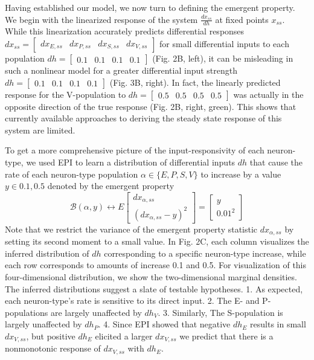 \documentclass[11pt]{article}
\begin{document}
Having established our model, we now turn to defining the emergent property. We begin with the linearized response of the system $\frac{dx_{ss}}{dh}$ at fixed points $x_{ss}$. 
While this linearization accurately predicts differential responses $dx_{ss} = \begin{bmatrix} dx_{E,ss} & dx_{P,ss} & dx_{S,ss} & dx_{V,ss} \end{bmatrix}$  for small differential inputs to each population $dh = \begin{bmatrix} 0.1 & 0.1 & 0.1 & 0.1 \end{bmatrix}$ (Fig. 2B, left), it can be misleading in such a nonlinear model for a greater differential input strength $dh = \begin{bmatrix} 0.1 & 0.1 & 0.1 & 0.1 \end{bmatrix}$ (Fig. 3B, right). In fact, the linearly predicted response for the V-population to $dh = \begin{bmatrix} 0.5 & 0.5 & 0.5 & 0.5 \end{bmatrix}$ was actually in the opposite direction of the true response (Fig. 2B, right, green).  This shows that currently available approaches  to deriving the steady state response of this system are limited.

To get a more comprehensive picture of the input-responsivity of each neuron-type, we used EPI to learn a distribution of differential inputs $dh$ that cause the rate of each neuron-type population $\alpha \in \{E, P, S, V \}$ to increase by a value $y \in {0.1, 0.5}$ denoted by the emergent property 
\begin{equation}
\mathcal{B}(\alpha, y) \leftrightarrow 
E \begin{bmatrix} dx_{\alpha,ss} \\ (dx_{\alpha,ss} - y)^2 \end{bmatrix} = \begin{bmatrix} y \\ 0.01^2 \end{bmatrix}
\end{equation}
Note that we restrict the variance of the emergent property statistic $dx_{\alpha,ss}$ by setting its second moment to a small value. In Fig. 2C, each column visualizes the inferred distribution of $dh$ corresponding to a specific neuron-type increase, while each row corresponds to amounts of increase 0.1 and 0.5. For visualization of this four-dimensional distribution, we show the two-dimensional marginal densities.  The inferred distributions suggest a slate of testable hypotheses. 1. As expected, each neuron-type's rate is sensitive to its direct input.  2. The E- and P-populations are largely unaffected by $dh_V$. 3. Similarly, The S-population is largely unaffected by $dh_P$. 4. Since EPI showed that negative $dh_E$ results in small $dx_{V,ss}$, but positive $dh_E$ elicited a larger $dx_{V,ss}$ we predict that there is a nonmonotonic response of $dx_{V,ss}$ with $dh_{E}$.
\end{document}
